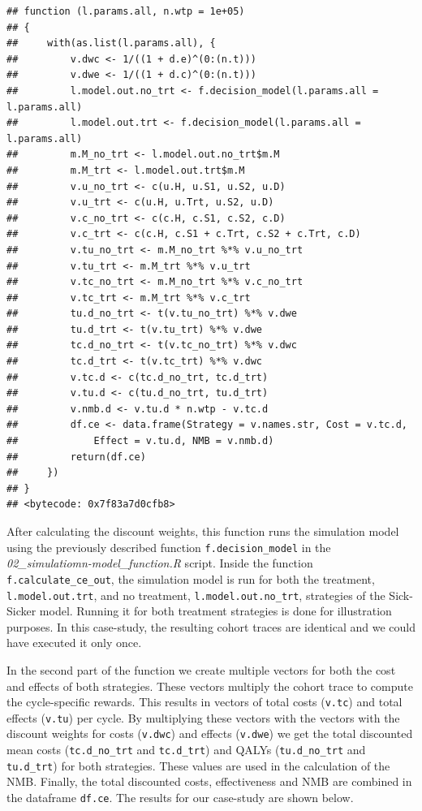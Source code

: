 \documentclass[]{article}
\begin{document}
\begin{verbatim}
## function (l.params.all, n.wtp = 1e+05) 
## {
##     with(as.list(l.params.all), {
##         v.dwc <- 1/((1 + d.e)^(0:(n.t)))
##         v.dwe <- 1/((1 + d.c)^(0:(n.t)))
##         l.model.out.no_trt <- f.decision_model(l.params.all = l.params.all)
##         l.model.out.trt <- f.decision_model(l.params.all = l.params.all)
##         m.M_no_trt <- l.model.out.no_trt$m.M
##         m.M_trt <- l.model.out.trt$m.M
##         v.u_no_trt <- c(u.H, u.S1, u.S2, u.D)
##         v.u_trt <- c(u.H, u.Trt, u.S2, u.D)
##         v.c_no_trt <- c(c.H, c.S1, c.S2, c.D)
##         v.c_trt <- c(c.H, c.S1 + c.Trt, c.S2 + c.Trt, c.D)
##         v.tu_no_trt <- m.M_no_trt %*% v.u_no_trt
##         v.tu_trt <- m.M_trt %*% v.u_trt
##         v.tc_no_trt <- m.M_no_trt %*% v.c_no_trt
##         v.tc_trt <- m.M_trt %*% v.c_trt
##         tu.d_no_trt <- t(v.tu_no_trt) %*% v.dwe
##         tu.d_trt <- t(v.tu_trt) %*% v.dwe
##         tc.d_no_trt <- t(v.tc_no_trt) %*% v.dwc
##         tc.d_trt <- t(v.tc_trt) %*% v.dwc
##         v.tc.d <- c(tc.d_no_trt, tc.d_trt)
##         v.tu.d <- c(tu.d_no_trt, tu.d_trt)
##         v.nmb.d <- v.tu.d * n.wtp - v.tc.d
##         df.ce <- data.frame(Strategy = v.names.str, Cost = v.tc.d, 
##             Effect = v.tu.d, NMB = v.nmb.d)
##         return(df.ce)
##     })
## }
## <bytecode: 0x7f83a7d0cfb8>
\end{verbatim}

After calculating the discount weights, this function runs the
simulation model using the previously described function
\texttt{f.decision\_model} in the
\emph{02\_simulatiomn-model\_function.R} script. Inside the function
\texttt{f.calculate\_ce\_out}, the simulation model is run for both the
treatment, \texttt{l.model.out.trt}, and no treatment,
\texttt{l.model.out.no\_trt}, strategies of the Sick-Sicker model.
Running it for both treatment strategies is done for illustration
purposes. In this case-study, the resulting cohort traces are identical
and we could have executed it only once.

In the second part of the function we create multiple vectors for both
the cost and effects of both strategies. These vectors multiply the
cohort trace to compute the cycle-specific rewards. This results in
vectors of total costs (\texttt{v.tc}) and total effects (\texttt{v.tu})
per cycle. By multiplying these vectors with the vectors with the
discount weights for costs (\texttt{v.dwc}) and effects (\texttt{v.dwe})
we get the total discounted mean costs (\texttt{tc.d\_no\_trt} and
\texttt{tc.d\_trt}) and QALYs (\texttt{tu.d\_no\_trt} and
\texttt{tu.d\_trt}) for both strategies. These values are used in the
calculation of the NMB. Finally, the total discounted costs,
effectiveness and NMB are combined in the dataframe \texttt{df.ce}. The
results for our case-study are shown below.
\end{document}
